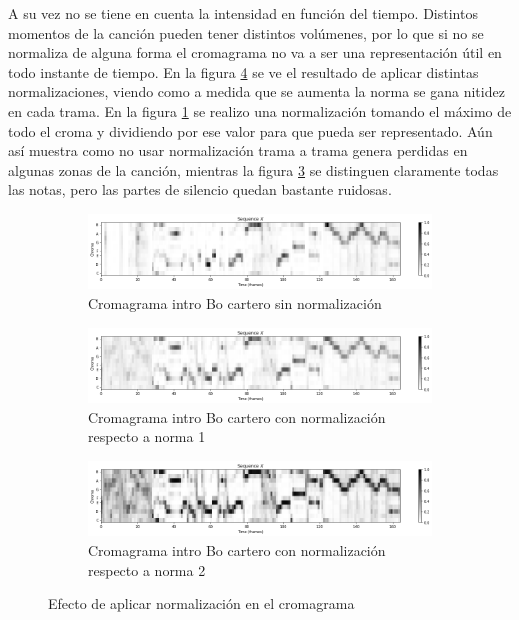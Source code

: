 \documentclass{article}
\begin{document}
A su vez no se tiene en cuenta la intensidad en función del tiempo. Distintos momentos de la canción pueden tener distintos volúmenes, por lo que si no se normaliza de alguna forma el cromagrama no va a ser una representación útil en todo instante de tiempo. En la figura \ref{normalizacion} se ve el resultado de aplicar distintas normalizaciones, viendo como a medida que se aumenta la norma se gana nitidez en cada trama. En la figura \ref{fig:16_sin_norma} se realizo una normalización tomando el máximo de todo el croma y dividiendo por ese valor para que pueda ser representado. Aún así muestra como no usar normalización trama a trama genera perdidas en algunas zonas de la canción, mientras la figura \ref{16_norma_2} se distinguen claramente todas las notas, pero las partes de silencio quedan bastante ruidosas.

\begin{figure}[!h]
\centering
\begin{subfigure}{\textwidth}
    \includegraphics[width=\textwidth]{chromas/bo_cartero_sin.png}
    \caption{Cromagrama intro Bo cartero sin normalización}
    \label{fig:16_sin_norma}
\end{subfigure}
\vfill
\begin{subfigure}{\textwidth}
    \includegraphics[width=\textwidth]{chromas/bo_cartero_con1.png}
    \caption{Cromagrama intro Bo cartero con normalización respecto a norma 1}
    \label{16_norma_1}
\end{subfigure}
\vfill
\begin{subfigure}{\textwidth}
\includegraphics[width=\textwidth]{chromas/bo_cartero_con.png}
    \caption{Cromagrama intro Bo cartero con normalización respecto a norma 2}
    \label{16_norma_2}
\end{subfigure}
\caption{Efecto de aplicar normalización en el cromagrama}
\label{normalizacion}
\end{figure}
\end{document}
